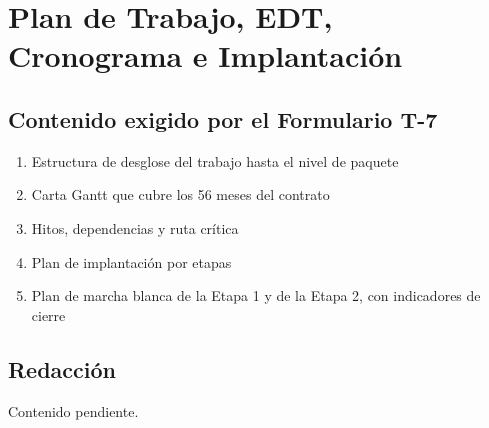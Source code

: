 \section{Plan de Trabajo, EDT, Cronograma e Implantación}

%

\subsection{Contenido exigido por el Formulario T-7}

\begin{enumerate}
    \item Estructura de desglose del trabajo hasta el nivel de paquete
    \item Carta Gantt que cubre los 56 meses del contrato
    \item Hitos, dependencias y ruta crítica
    \item Plan de implantación por etapas
    \item Plan de marcha blanca de la Etapa 1 y de la Etapa 2, con indicadores de cierre
\end{enumerate}

\subsection{Redacción}

Contenido pendiente.

